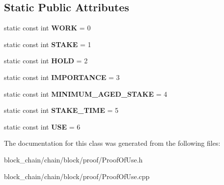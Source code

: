 \subsection*{Static Public Attributes}
\begin{DoxyCompactItemize}
\item 
\mbox{\label{classProof_a457d231986439ee6bcc945daacfc28fc}} 
static const int {\bfseries W\+O\+RK} = 0
\item 
\mbox{\label{classProof_acf157976c3c86ef2fd0e838b8c4ac992}} 
static const int {\bfseries S\+T\+A\+KE} = 1
\item 
\mbox{\label{classProof_ae5c2a86640bf558ff5625157e23b3eec}} 
static const int {\bfseries H\+O\+LD} = 2
\item 
\mbox{\label{classProof_a4e71a5e5928900794353acdd169ca652}} 
static const int {\bfseries I\+M\+P\+O\+R\+T\+A\+N\+CE} = 3
\item 
\mbox{\label{classProof_a1a08ffc465f4fcfde396d4c4feb22eb0}} 
static const int {\bfseries M\+I\+N\+I\+M\+U\+M\+\_\+\+A\+G\+E\+D\+\_\+\+S\+T\+A\+KE} = 4
\item 
\mbox{\label{classProof_a1aa2cb91c5be4ca021714ff6fc01da4a}} 
static const int {\bfseries S\+T\+A\+K\+E\+\_\+\+T\+I\+ME} = 5
\item 
\mbox{\label{classProof_a3f6898fa1d652d32182c3c387c8e979c}} 
static const int {\bfseries U\+SE} = 6
\end{DoxyCompactItemize}


The documentation for this class was generated from the following files\+:\begin{DoxyCompactItemize}
\item 
block\+\_\+chain/chain/block/proof/Proof\+Of\+Use.\+h\item 
block\+\_\+chain/chain/block/proof/Proof\+Of\+Use.\+cpp\end{DoxyCompactItemize}
